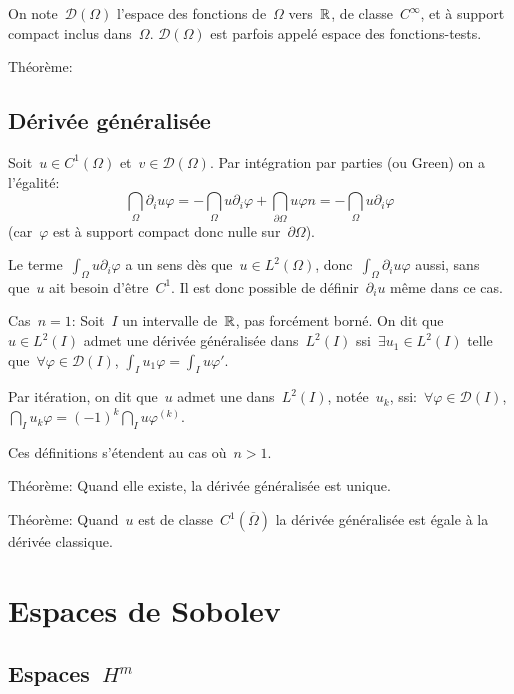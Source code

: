 On note~$\mathcal{D}(\Omega)$ l'espace des fonctions de~$\Omega$ vers~$\mathbb R$, de
classe~$C^\infty$, et à support compact inclus dans~$\Omega$.
$\mathcal{D}(\Omega)$ est parfois appelé espace des fonctions-tests.

Théorème: 

\medskip
\subsection*{Dérivée généralisée}

Soit~$u\in C^1(\Omega)$ et~$v\in\mathcal{D}(\Omega)$. 
Par intégration par parties (ou Green) on a l'égalité:
\[
\dint_\Omega \partial_iu \varphi = -\dint_\Omega u \partial_i\varphi
+\dint_{\partial\Omega} u\varphi n
= -\dint_\Omega u \partial_i\varphi
\]
(car~$\varphi$ est à support compact donc nulle sur~$\partial\Omega$).

Le terme~$\int_\Omega u \partial_i\varphi$ a un sens dès que~$u\in L^2(\Omega)$,
donc~$\int_\Omega \partial_iu \varphi$ aussi, sans que~$u$ ait besoin d'être~$C^1$.
Il est donc possible de définir~$\partial_i u$ même dans ce cas.

\medskip
Cas~$n=1$: Soit~$I$ un intervalle de~$\mathbb R$, pas forcément borné. 
On dit que~$u\in L^2(I)$ admet une dérivée généralisée dans~$L^2(I)$ 
ssi~$\exists u_1\in L^2(I)$ telle que~$\forall\varphi\in\mathcal{D}(I)$,
$\int_I u_1\varphi = \int_I u\varphi'$.

Par itération, on dit que~$u$ admet une  dans~$L^2(I)$, notée~$u_k$, ssi:~$\forall\varphi\in\mathcal{D}(I)$,
$\dint_I u_k\varphi = (-1)^k\dint_I u\varphi^{(k)}$.

Ces définitions s'étendent au cas où~$n>1$.

\medskip
Théorème: Quand elle existe, la dérivée généralisée est unique.

Théorème: Quand~$u$ est de classe~$C^1(\overline{\Omega})$ la dérivée généralisée 
est égale à la dérivée classique.




\medskip
\section*{Espaces de Sobolev}

\medskip
\subsection*{Espaces~$H^m$}


